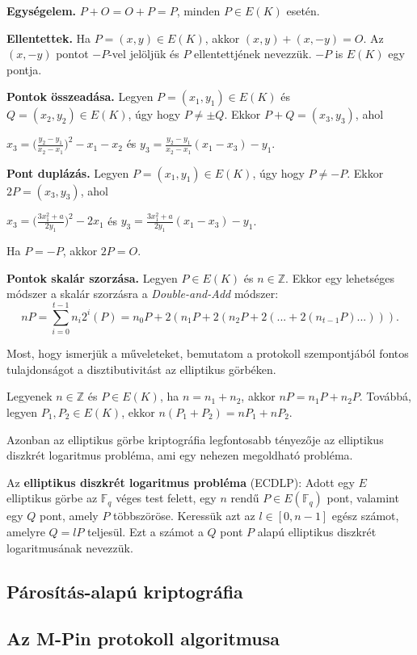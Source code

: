 \begin{outdentlist}
    \item[]
    \textbf{Egységelem.} $P + O = O + P = P$, minden $P \in E(K)$ esetén.

    \item[]
    \textbf{Ellentettek.} Ha $P = (x, y) \in E(K)$, akkor $(x, y) + (x, -y) = O$. Az $(x, -y)$ pontot $-P$-vel jelöljük és $P$ ellentettjének nevezzük. $-P$ is $E(K)$ egy pontja.

    \item[]
    \textbf{Pontok összeadása.} Legyen $P = (x_1, y_1) \in E(K)$ és $Q = (x_2, y_2) \in E(K)$, úgy hogy $P \neq \pm Q$. Ekkor $P + Q = (x_3, y_3)$, ahol 
    \begin{center}$x_3 = \big(\frac{y_2 - y_1}{x_2 - x_1}\big)^2 - x_1 - x_2$ és $y_3 = \frac{y_2 - y_1}{x_2 - x_1}(x_1 - x_3) - y_1$.\end{center}

    \item[]
    \textbf{Pont duplázás.} Legyen $P = (x_1, y_1) \in E(K)$, úgy hogy $P \neq -P$. Ekkor $2P = (x_3, y_3)$, ahol
    \begin{center}$x_3 = \big(\frac{3x_1^2 + a}{2y_1}\big)^2 - 2x_1$ és $y_3 = \frac{3x_1^2 + a}{2y_1}(x_1 - x_3) - y_1$.\end{center} Ha $P = -P$, akkor $2P = O$.

    \item[]
    \textbf{Pontok skalár szorzása.} Legyen $P \in E(K)$ és $n \in \mathbb{Z}$. Ekkor egy lehetséges módszer a skalár szorzásra a \textit{Double-and-Add} módszer: $$nP = \sum_{i = 0}^{t-1} n_i 2^i(P) = n_0P + 2(n_1P + 2(n_2P + 2(... + 2(n_{t-1}P)...))).$$
\end{outdentlist}

Most, hogy ismerjük a műveleteket, bemutatom a protokoll szempontjából fontos tulajdonságot a disztibutivitást az elliptikus görbéken.

Legyenek $n \in \mathbb{Z}$ és $P \in E(K)$, ha $n = n_1 + n_2$, akkor $nP = n_1P + n_2P$. Továbbá, legyen $P_1, P_2 \in E(K)$, ekkor $n(P_1 + P_2) = nP_1 + nP_2$.

Azonban az elliptikus görbe kriptográfia legfontosabb tényezője az elliptikus diszkrét logaritmus probléma, ami egy nehezen megoldható probléma.

\begin{definition*}
    Az \textbf{elliptikus diszkrét logaritmus probléma} (ECDLP): Adott egy $E$ elliptikus görbe az $\mathbb{F}_q$ véges test felett, egy $n$ rendű $P \in E(\mathbb{F}_q)$ pont, valamint egy $Q$ pont, amely $P$ többszöröse. Keressük azt az $l \in [0, n - 1]$ egész számot, amelyre $Q = lP$ teljesül. Ezt a számot a $Q$ pont $P$ alapú elliptikus diszkrét logaritmusának nevezzük.
\end{definition*}

\subsection*{Párosítás-alapú kriptográfia}

\subsection*{Az M-Pin protokoll algoritmusa}